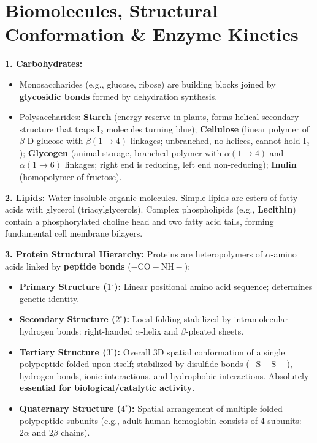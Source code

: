 \documentclass[10pt,twoside,openright]{book}
\begin{document}
\section{Biomolecules, Structural Conformation \& Enzyme Kinetics}

\begin{conceptbox}
\textbf{1. Carbohydrates:}
\begin{itemize}
  \item Monosaccharides (e.g., glucose, ribose) are building blocks joined by \textbf{glycosidic bonds} formed by dehydration synthesis.
  \item Polysaccharides: \textbf{Starch} (energy reserve in plants, forms helical secondary structure that traps $\mathrm{I}_2$ molecules turning blue); \textbf{Cellulose} (linear polymer of $\beta$-D-glucose with $\beta(1\to 4)$ linkages; unbranched, no helices, cannot hold $\mathrm{I}_2$); \textbf{Glycogen} (animal storage, branched polymer with $\alpha(1\to 4)$ and $\alpha(1\to 6)$ linkages; right end is reducing, left end non-reducing); \textbf{Inulin} (homopolymer of fructose).
\end{itemize}

\textbf{2. Lipids:}
Water-insoluble organic molecules. Simple lipids are esters of fatty acids with glycerol (triacylglycerols). Complex phospholipids (e.g., \textbf{Lecithin}) contain a phosphorylated choline head and two fatty acid tails, forming fundamental cell membrane bilayers.

\textbf{3. Protein Structural Hierarchy:}
Proteins are heteropolymers of $\alpha$-amino acids linked by \textbf{peptide bonds} ($-\mathrm{CO-NH}-$):
\begin{itemize}
  \item \textbf{Primary Structure ($1^\circ$):} Linear positional amino acid sequence; determines genetic identity.
  \item \textbf{Secondary Structure ($2^\circ$):} Local folding stabilized by intramolecular hydrogen bonds: right-handed $\alpha$-helix and $\beta$-pleated sheets.
  \item \textbf{Tertiary Structure ($3^\circ$):} Overall 3D spatial conformation of a single polypeptide folded upon itself; stabilized by disulfide bonds ($-\mathrm{S-S-}$), hydrogen bonds, ionic interactions, and hydrophobic interactions. Absolutely \textbf{essential for biological/catalytic activity}.
  \item \textbf{Quaternary Structure ($4^\circ$):} Spatial arrangement of multiple folded polypeptide subunits (e.g., adult human hemoglobin consists of $4$ subunits: $2\alpha$ and $2\beta$ chains).
\end{itemize}
\end{conceptbox}
\end{document}
